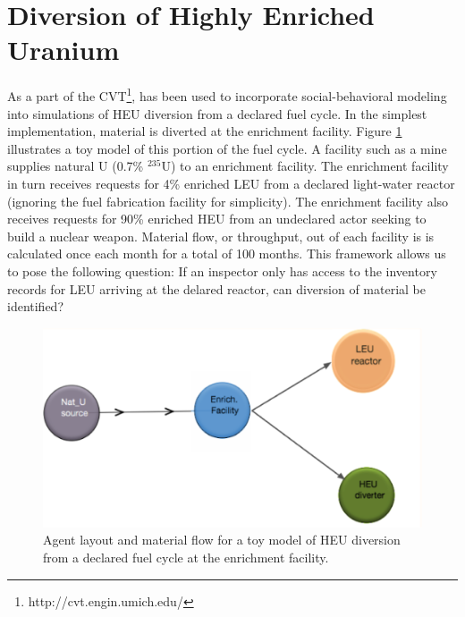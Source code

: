 \section{Diversion of Highly Enriched Uranium}
\label{s_results}
As a part of the \gls{CVT}\footnote{http://cvt.engin.umich.edu/}, \Cyclus has been used to incorporate social-behavioral modeling into simulations of \gls{HEU} diversion from a declared fuel cycle.  In the simplest implementation, material is diverted at the enrichment facility.  Figure \ref{fig:heu_layout} illustrates a toy model of this portion of the fuel cycle. A facility such as a mine supplies natural \gls{U} (0.7\% $^{235}$U) to an enrichment facility.  The enrichment facility in turn receives requests for 4\% enriched \gls{LEU} from a declared light-water reactor (ignoring the fuel fabrication facility for simplicity).  The enrichment facility also receives requests for 90\% enriched \gls{HEU} from an undeclared actor seeking to build a nuclear weapon. Material flow, or throughput, out of each facility is is calculated once each month for a total of 100 months.  This framework allows us to pose the following question: If an inspector only has access to the inventory records for LEU arriving at the delared reactor, can diversion of material be identified?

\begin{figure}%
\begin{center}
\includegraphics[natwidth=162bp,natheight=227bp, scale=0.7]{./figs/heu_cyclist_layout.png}
\end{center}
\caption{Agent layout and material flow for a toy model of \gls{HEU} diversion from a declared fuel cycle at the enrichment facility.}
\label{fig:heu_layout}
\end{figure}

